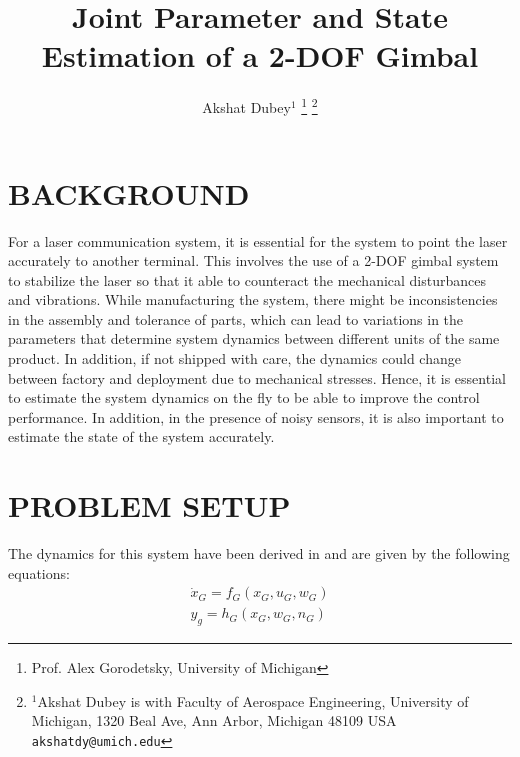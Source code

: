 \documentclass[letterpaper, 10 pt, conference]{ieeeconf}  %
\title{\LARGE \bf
Joint Parameter and State Estimation of a 2-DOF Gimbal
}
\author{Akshat Dubey$^{1}$%
\thanks{Prof. Alex Gorodetsky, University of Michigan}%
\thanks{$^{1}$Akshat Dubey is with Faculty of Aerospace Engineering,
        University of Michigan, 1320 Beal Ave, Ann Arbor, Michigan 48109 USA
        {\tt\small akshatdy@umich.edu}}%
}
\begin{document}
\maketitle
\thispagestyle{empty}
\pagestyle{empty}


\section{BACKGROUND}

For a laser communication system, it is essential for the system to point the laser accurately to another terminal.
This involves the use of a 2-DOF gimbal system to stabilize the laser so that it able to counteract the
mechanical disturbances and vibrations.
While manufacturing the system, there might be inconsistencies in the assembly and tolerance of parts, which can
lead to variations in the parameters that determine system dynamics between different units of the same product.
In addition, if not shipped with care, the dynamics could change between factory and deployment due to
mechanical stresses.
Hence, it is essential to estimate the system dynamics on the fly to be able to improve the control performance.
In addition, in the presence of noisy sensors, it is also important to estimate the state of the system accurately.


\section{PROBLEM SETUP}
The dynamics for this system have been derived in \cite{c1} and are given by the following equations:
\begin{equation}
  \begin{aligned}
    \dot{x}_G = f_G(x_G, u_G, w_G) \\
    y_g = h_G(x_G, w_G, n_G)
  \end{aligned}
\end{equation}
\end{document}
